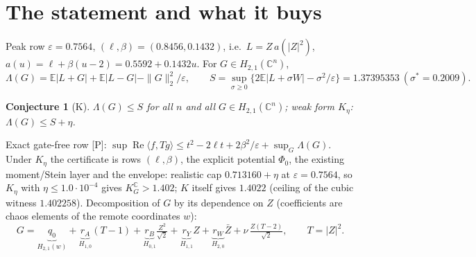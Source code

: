 \documentclass[11pt,a4paper]{article}
\newtheorem{conjecture}{Conjecture}\newtheorem{theorem}{Theorem}\newtheorem{proposition}{Proposition}
\newcommand{\C}{\mathbb{C}}\newcommand{\R}{\mathbb{R}}\newcommand{\E}{\mathbb{E}}\newcommand{\Hc}[2]{H_{#1,#2}}
\renewcommand{\Re}{\operatorname{Re}}\newcommand{\Var}{\operatorname{Var}}\newcommand{\ph}{\operatorname{phase}}\newcommand{\st}[1]{\textsf{[#1]}}\newcommand{\brkus}{\textunderscore\allowbreak}\usepackage{xstring,adjustbox}\DeclareRobustCommand{\code}[1]{\begingroup\noexpandarg\StrSubstitute{#1}{/}{/\allowbreak}[\brktmp]\texttt{\let\_\brkus\hyphenchar\font=`\-\brktmp}\endgroup}\setlength{\emergencystretch}{3em}
\begin{document}
\section{The statement and what it buys}
Peak row $\varepsilon=0.7564$, $(\ell,\beta)=(0.8456,0.1432)$, i.e.\ $L=Z\,a(|Z|^2)$, $a(u)=\ell+\beta(u-2)=0.5592+0.1432u$. For $G\in\Hc21(\C^n)$,
\[
\Lambda(G)=\E|L+G|+\E|L-G|-\|G\|_2^2/\varepsilon,\qquad S=\sup_{\sigma\ge0}\{2\E|L+\sigma W|-\sigma^2/\varepsilon\}=1.37395353\ (\sigma^*=0.2009).
\]
\begin{conjecture}[K] $\Lambda(G)\le S$ for all $n$ and all $G\in\Hc21(\C^n)$; weak form $K_\eta$: $\Lambda(G)\le S+\eta$.\end{conjecture}
Exact gate-free row \st{P}: $\sup\Re\langle f,Tg\rangle\le t^2-2\ell t+2\beta^2/\varepsilon+\sup_G\Lambda(G)$. Under $K_\eta$ the certificate is rows $(\ell,\beta)$, the explicit potential
$\Phi_0$, the existing moment/Stein layer and the envelope: realistic cap $0.713160+\eta$ at $\varepsilon=0.7564$, so $K_\eta$ with $\eta\le1.0\cdot10^{-4}$ gives $K_G^{\C}>1.402$; $K$ itself
gives $1.4022$ (ceiling of the cubic witness $1.402258$). Decomposition of $G$ by its dependence on $Z$ (coefficients are chaos elements of the remote coordinates $w$):
\[
G=\underbrace{q_0}_{\Hc21(w)}+\underbrace{r_A}_{\Hc10}(T-1)+\underbrace{r_B}_{\Hc01}\tfrac{Z^2}{\sqrt2}+\underbrace{r_Y}_{\Hc11}Z+\underbrace{r_W}_{\Hc20}\bar Z+\nu\,\tfrac{Z(T-2)}{\sqrt2},\qquad T=|Z|^2 .
\]
\end{document}
